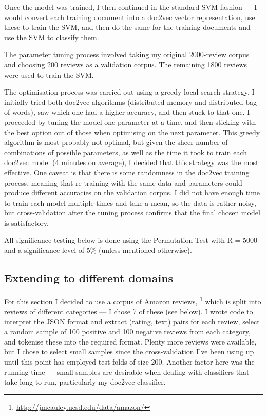\documentclass[12pt,a4paper,twoside]{article}
\begin{document}
Once the model was trained, I then continued in the standard SVM fashion --- I would convert each training document into a doc2vec vector representation, use these to train the SVM, and then do the same for the training documents and use the SVM to classify them.

The parameter tuning process involved taking my original 2000-review corpus and choosing 200 reviews as a validation corpus. The remaining 1800 reviews were used to train the SVM.

The optimisation process was carried out using a greedy local search strategy. I initially tried both doc2vec algorithms (distributed memory and distributed bag of words), saw which one had a higher accuracy, and then stuck to that one. I proceeded by tuning the model one parameter at a time, and then sticking with the best option out of those when optimising on the next parameter. This greedy algorithm is most probably not optimal, but given the sheer number of combinations of possible parameters, as well as the time it took to train each doc2vec model (4 minutes on average), I decided that this strategy was the most effective. One caveat is that there is some randomness in the doc2vec training process, meaning that re-training with the same data and parameters could produce different accuracies on the validation corpus. I did not have enough time to train each model multiple times and take a mean, so the data is rather noisy, but cross-validation after the tuning process confirms that the final chosen model is satisfactory.

All significance testing below is done using the Permutation Test with R = 5000 and a significance level of 5\% (unless mentioned otherwise).

\subsection{Extending to different domains}

For this section I decided to use a corpus of Amazon reviews, \footnote{\url{http://jmcauley.ucsd.edu/data/amazon/}} which is split into reviews of different categories --- I chose 7 of these (see below). I wrote code to interpret the JSON format and extract (rating, text) pairs for each review, select a random sample of 100 positive and 100 negative reviews from each category, and tokenise these into the required format. Plenty more reviews were available, but I chose to select small samples since the cross-validation I've been using up until this point has employed test folds of size 200. Another factor here was the running time --- small samples are desirable when dealing with classifiers that take long to run, particularly my doc2vec classifier.
\end{document}
